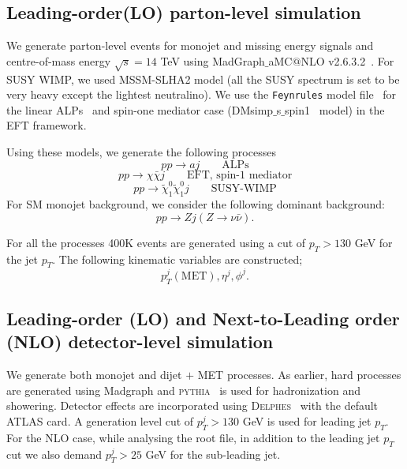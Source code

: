 \documentclass[prd,aps,letterpaper,floatfix,superscriptaddress,preprintnumbers,twocolumn,10pt,nofootinbib]{revtex4-1}
\newcommand{\be}{\begin{equation}}
\newcommand{\ee}{\end{equation}}
\begin{document}
\subsection{Leading-order(LO) parton-level simulation}
We generate parton-level events for monojet and missing energy signals and centre-of-mass energy $\sqrt{s}=14$ TeV using  MadGraph$\_$aMC$@$NLO v2.6.3.2~\cite{Alwall:2011uj}. 
For SUSY WIMP, we used MSSM-SLHA2 model (all the SUSY spectrum is set to be very heavy except the lightest  neutralino). We use the {\tt Feynrules} model file~\cite{Christensen:2008py,Degrande:2011ua} for the linear ALPs~\cite{linearalps} and  spin-one mediator case (DMsimp$\_$s$\_$spin1~\cite{dmsimp_s_spin1} model) in the EFT framework. 

Using these models, we generate the following processes
\be  p p \rightarrow a j \qquad \mbox{ALPs} \ee
\be  p p \rightarrow \chi \bar \chi j \qquad \mbox{EFT, spin-1 mediator} \ee
\be p p \rightarrow  \tilde \chi^0_1  \tilde \chi^0_1 j \qquad \mbox{SUSY-WIMP}  \ee
For SM monojet background, we consider the following dominant background:
\be  pp \rightarrow Z j (Z \rightarrow \nu\bar\nu). \ee


For all the processes 400K events are generated using a cut of $p_T > 130$ GeV for the jet $p_T$. The following kinematic variables are constructed;
\[p_T^j ({\text{MET}}) ,\eta^j, \phi^j.  \]


\subsection{Leading-order (LO) and Next-to-Leading order (NLO) detector-level simulation}
We generate both monojet and dijet $+$ MET processes. As earlier, hard processes are generated using Madgraph and \textsc{pythia}~\cite{Sjostrand:2007gs} is used for hadronization and showering.
Detector effects are incorporated using \textsc{Delphes}~\cite{deFavereau:2013fsa} with the default ATLAS card. A generation level cut of $p_T^j > 130$ GeV is used for leading jet $p_T$. For the NLO case, while analysing the root file, in addition to the
leading jet $p_T$ cut we also demand $p_T^j > 25$ GeV for the sub-leading jet. 
\end{document}
